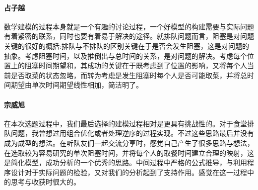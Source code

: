\documentclass[lang=cn,10pt,a4paper]{elegantpaper}
\begin{document}
\paragraph{占子越}
数学建模的过程本身就是一个有趣的讨论过程，一个好模型的构建需要与实际问题有着紧密的联系，同时也要有着易于解决的途径。就排队问题而言，阻塞是对问题关键的很好的概括:排队与不排队的区别关键在于是否会发生阻塞，这是对问题的抽象。考虑阻塞时间，以及推倒出与总时间的关系，是对问题的解决。考虑每个位置上的阻塞时间期望和，其成功的关键在于既考虑到了位置的影响，又将每个人当前是否取菜的状态忽略，而转为考虑是发生阻塞时每个人是否可能取菜，并将总时间期望由单次时间期望线性相加，简洁明了。
\paragraph{宗威旭}
在本次选题过程中，我们最后选择的建模过程相对是更具有挑战性的。对于食堂排队问题，我曾想过用组合优化或者处理逆序的过程实现。不过这些思路最后并没有成为成型的想法。在听队友们一起交流分享时，感觉自己产生了很多思路与想法，在选取较为容易研究的单次阻塞时间，并将每个人的取餐时间建立合理的映射，这是简化模型，成功分析的一个优秀的思路。中间过程中严格的公式推导，与利用程序设计对于实际问题的检验，又对我们的分析起到了支持作用。感觉在这一过程中的思考与收获时很大的。
\end{document}
